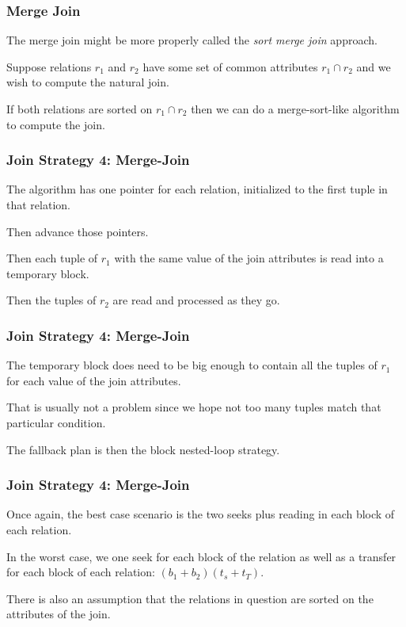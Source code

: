 \begin{frame}
\frametitle{Merge Join}

The merge join might be more properly called the \textit{sort merge join} approach. 

Suppose relations $r_{1}$ and $r_{2}$ have some set of common attributes $r_{1} \cap r_{2}$ and we wish to compute the natural join. 

If both relations are sorted on  $r_{1} \cap r_{2}$ then we can do a merge-sort-like algorithm to compute the join.

\end{frame}


\begin{frame}
\frametitle{Join Strategy 4: Merge-Join}

The algorithm has one pointer for each relation, initialized to the first tuple in that relation. 

Then advance those pointers. 

Then each tuple of $r_{1}$ with the same value of the join attributes is read into a temporary block. 

Then the tuples of $r_{2}$ are read and processed as they go.

\end{frame}


\begin{frame}
\frametitle{Join Strategy 4: Merge-Join}

The temporary block does need to be big enough to contain all the tuples of $r_{1}$ for each value of the join attributes. 

That is usually not a problem since we hope not too many tuples match that particular condition. 


The fallback plan is then the block nested-loop strategy.


\end{frame}


\begin{frame}
\frametitle{Join Strategy 4: Merge-Join}

Once again, the best case scenario is the two seeks plus reading in each block of each relation. 

In the worst case, we one seek for each block of the relation as well as a transfer for each block of each relation: $(b_{1} + b_{2})(t_{s} + t_{T})$.

There is also an assumption that the relations in question are sorted on the attributes of the join. 


\end{frame}

